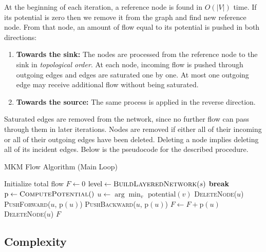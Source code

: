 At the beginning of each iteration, a reference node is found in $O(|V|)$ time. If its potential is zero then we remove it from the graph and find new reference node. From that node, an amount of flow equal to its potential is pushed in both directions:

\begin{enumerate}
  \item \textbf{Towards the sink:}
      The nodes are processed from the reference node to the sink in \emph{topological order}.
      At each node, incoming flow is pushed through outgoing edges and edges are saturated one by one. At most one outgoing edge may receive additional flow without being saturated.
  \item \textbf{Towards the source:}
    The same process is applied in the reverse direction.

\end{enumerate}

Saturated edges are removed from the network, since no further flow can pass through them in later iterations.
Nodes are removed if either all of their incoming or all of their outgoing edges have been deleted.
Deleting a node implies deleting all of its incident edges. Below is the pseudocode for the described procedure.

\begin{algorithm}[H]
\caption{MKM Flow Algorithm (Main Loop)}
\begin{algorithmic}[1]
\State Initialize total flow $F \gets 0$
    \State $\text{level} \gets \textsc{BuildLayeredNetwork}(s)$ 
        \State \textbf{break}
    \EndIf
    \State $\text{p} \gets \textsc{ComputePotential}()$
    \State $u \gets \displaystyle\arg\min_{v } \text{ potential}(v)$ 
            \State \textsc{DeleteNode}($u$)
        \Else
            \State \textsc{PushForward}($u$, $\text{p}(u)$)
            \State \textsc{PushBackward}($u$, $\text{p}(u)$)
            \State $F \gets F + \text{p}(u)$
            \State \textsc{DeleteNode}($u$)
        \EndIf
    \EndWhile
\EndWhile
\State \Return $F$
\end{algorithmic}
\end{algorithm}

\subsection{Complexity}\label{sec:complexity}

